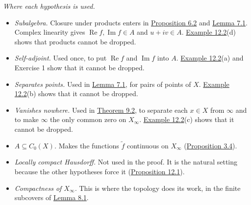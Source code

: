 \documentclass[
  english,
  11pt,
  a4paper,
]{article}
\providecommand{\tightlist}{%
  \setlength{\itemsep}{0pt}\setlength{\parskip}{0pt}}
\begin{document}
\emph{Where each hypothesis is used.}

\begin{itemize}
\tightlist
\item
  \emph{Subalgebra.} Closure under products enters in
  \hyperlink{the-stone-weierstrass-theorem-for-functions-vanishing-at-infinity--oa-fnd-sw-04}{Proposition
  6.2} and
  \hyperlink{the-stone-weierstrass-theorem-for-functions-vanishing-at-infinity--oa-fnd-sw-05}{Lemma
  7.1}. Complex linearity gives
  \(\operatorname{Re}f,\operatorname{Im}f\in A\) and \(u+iv\in A\).
  \hyperlink{the-stone-weierstrass-theorem-for-functions-vanishing-at-infinity--oa-fnd-sw-11}{Example
  12.2}(d) shows that products cannot be dropped.
\item
  \emph{Self-adjoint.} Used once, to put \(\operatorname{Re}f\) and
  \(\operatorname{Im}f\) into \(A\).
  \hyperlink{the-stone-weierstrass-theorem-for-functions-vanishing-at-infinity--oa-fnd-sw-11}{Example
  12.2}(a) and Exercise 1 show that it cannot be dropped.
\item
  \emph{Separates points.} Used in
  \hyperlink{the-stone-weierstrass-theorem-for-functions-vanishing-at-infinity--oa-fnd-sw-05}{Lemma
  7.1}, for pairs of points of \(X\).
  \hyperlink{the-stone-weierstrass-theorem-for-functions-vanishing-at-infinity--oa-fnd-sw-11}{Example
  12.2}(b) shows that it cannot be dropped.
\item
  \emph{Vanishes nowhere.} Used in
  \hyperlink{the-stone-weierstrass-theorem-for-functions-vanishing-at-infinity--oa-fnd-sw-08}{Theorem
  9.2}, to separate each \(x\in X\) from \(\infty\) and to make
  \(\infty\) the only common zero on \(X_\infty\).
  \hyperlink{the-stone-weierstrass-theorem-for-functions-vanishing-at-infinity--oa-fnd-sw-11}{Example
  12.2}(c) shows that it cannot be dropped.
\item
  \emph{\(A\subseteq C_0(X)\).} Makes the functions \(\tilde f\)
  continuous on \(X_\infty\)
  (\hyperlink{the-stone-weierstrass-theorem-for-functions-vanishing-at-infinity--oa-fnd-sw-03}{Proposition
  3.4}).
\item
  \emph{Locally compact Hausdorff.} Not used in the proof. It is the
  natural setting because the other hypotheses force it
  (\hyperlink{the-stone-weierstrass-theorem-for-functions-vanishing-at-infinity--oa-fnd-sw-10}{Proposition
  12.1}).
\item
  \emph{Compactness of \(X_\infty\).} This is where the topology does
  its work, in the finite subcovers of
  \hyperlink{the-stone-weierstrass-theorem-for-functions-vanishing-at-infinity--oa-fnd-sw-06}{Lemma
  8.1}.
\end{itemize}
\end{document}
